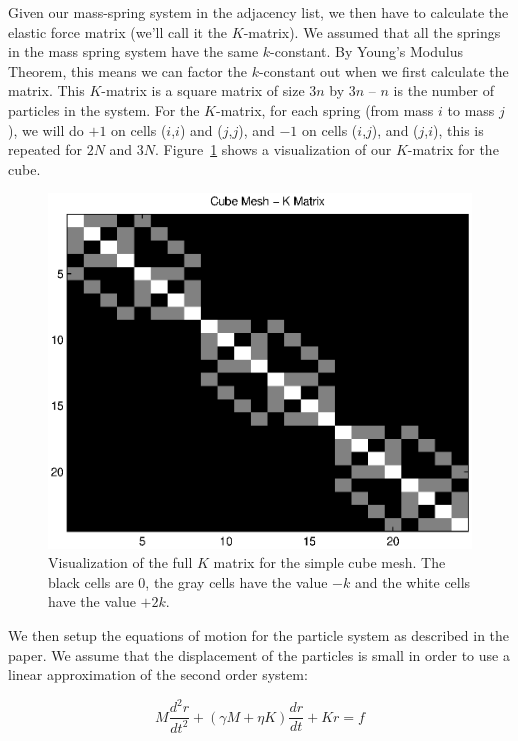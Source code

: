 \documentclass{article}
\begin{document}
  Given our mass-spring system in the adjacency list, we then have to calculate
  the elastic force matrix (we'll call it the $K$-matrix). We assumed that all the
  springs in the mass spring system have the same $k$-constant. By Young's Modulus
  Theorem, this means we can factor the $k$-constant out when we first calculate
  the matrix. This $K$-matrix is a square matrix of size $3n$ by $3n$ -- $n$ is the
  number of particles in the system. For the $K$-matrix, for each spring (from mass
  $i$ to mass $j$), we will do $+1$ on cells  ($i$,$i$) and ($j$,$j$), and $-1$
  on cells ($i$,$j$), and ($j$,$i$), this is repeated for $2N$ and $3N$.
  Figure~\ref{fig:kmatrix} shows a visualization of our $K$-matrix for the cube. 

  \begin{figure}[H]
    \begin{center}
        \includegraphics[width=0.8\columnwidth]{cube_mesh_Kmatrix} 
    \end{center} 
    \caption{Visualization of the full $K$ matrix for the simple cube mesh. The
              black cells are $0$, the gray cells have the value $-k$ and the white
              cells have the value $+2k$.}
    \label{fig:kmatrix}
  \end{figure}



  We then setup the equations of motion for the particle system as described in
  the paper. We assume that the displacement of the particles is small in order
  to use a linear approximation of the second order system:

  $$
    M\frac{d^2 r}{dt^2} + (\gamma M + \eta K) \frac{dr}{dt} + Kr = f
  $$
\end{document}
